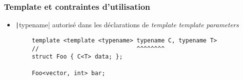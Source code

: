 \documentclass[C++.tex]{subfiles}
\begin{document}
\begin{frame}[fragile]
	\frametitle{Template et contraintes d'utilisation}
	\begin{itemize}
		\item \texttt|typename| autorisé dans les déclarations de \textit{template template parameters}
	\end{itemize}

	\begin{verbatim}
		template <template <typename> typename C, typename T>
		//                            ^^^^^^^^
		struct Foo { C<T> data; };

		Foo<vector, int> bar;
	\end{verbatim}


\end{frame}
\end{document}

